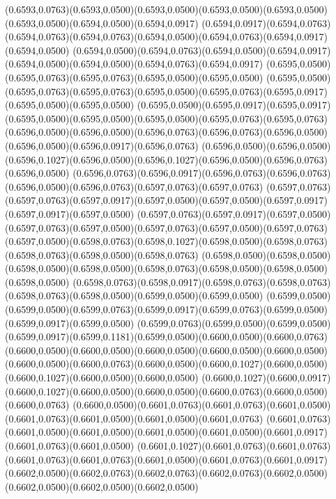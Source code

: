 (0.6593,0.0763)(0.6593,0.0500)(0.6593,0.0500)(0.6593,0.0500)(0.6593,0.0500)(0.6593,0.0500)(0.6594,0.0500)(0.6594,0.0917)
(0.6594,0.0917)(0.6594,0.0763)(0.6594,0.0763)(0.6594,0.0763)(0.6594,0.0500)(0.6594,0.0763)(0.6594,0.0917)(0.6594,0.0500)
(0.6594,0.0500)(0.6594,0.0763)(0.6594,0.0500)(0.6594,0.0917)(0.6594,0.0500)(0.6594,0.0500)(0.6594,0.0763)(0.6594,0.0917)
(0.6595,0.0500)(0.6595,0.0763)(0.6595,0.0763)(0.6595,0.0500)(0.6595,0.0500)
\PST@Solid(0.6595,0.0500)(0.6595,0.0763)(0.6595,0.0763)(0.6595,0.0500)(0.6595,0.0763)(0.6595,0.0917)(0.6595,0.0500)(0.6595,0.0500)
(0.6595,0.0500)(0.6595,0.0917)(0.6595,0.0917)(0.6595,0.0500)(0.6595,0.0500)(0.6595,0.0500)(0.6595,0.0763)(0.6595,0.0763)
(0.6596,0.0500)(0.6596,0.0500)(0.6596,0.0763)(0.6596,0.0763)(0.6596,0.0500)(0.6596,0.0500)(0.6596,0.0917)(0.6596,0.0763)
(0.6596,0.0500)(0.6596,0.0500)(0.6596,0.1027)(0.6596,0.0500)(0.6596,0.1027)(0.6596,0.0500)(0.6596,0.0763)(0.6596,0.0500)
(0.6596,0.0763)(0.6596,0.0917)(0.6596,0.0763)(0.6596,0.0763)(0.6596,0.0500)(0.6596,0.0763)(0.6597,0.0763)(0.6597,0.0763)
(0.6597,0.0763)(0.6597,0.0763)(0.6597,0.0917)(0.6597,0.0500)(0.6597,0.0500)(0.6597,0.0917)(0.6597,0.0917)(0.6597,0.0500)
(0.6597,0.0763)(0.6597,0.0917)(0.6597,0.0500)(0.6597,0.0763)(0.6597,0.0500)(0.6597,0.0763)(0.6597,0.0500)(0.6597,0.0763)
(0.6597,0.0500)(0.6598,0.0763)(0.6598,0.1027)(0.6598,0.0500)(0.6598,0.0763)(0.6598,0.0763)(0.6598,0.0500)(0.6598,0.0763)
(0.6598,0.0500)(0.6598,0.0500)(0.6598,0.0500)(0.6598,0.0500)(0.6598,0.0763)(0.6598,0.0500)(0.6598,0.0500)(0.6598,0.0500)
(0.6598,0.0763)(0.6598,0.0917)(0.6598,0.0763)(0.6598,0.0763)(0.6598,0.0763)(0.6598,0.0500)(0.6599,0.0500)(0.6599,0.0500)
(0.6599,0.0500)(0.6599,0.0500)(0.6599,0.0763)(0.6599,0.0917)(0.6599,0.0763)(0.6599,0.0500)(0.6599,0.0917)(0.6599,0.0500)
(0.6599,0.0763)(0.6599,0.0500)(0.6599,0.0500)(0.6599,0.0917)(0.6599,0.1181)(0.6599,0.0500)(0.6600,0.0500)(0.6600,0.0763)
(0.6600,0.0500)(0.6600,0.0500)(0.6600,0.0500)(0.6600,0.0500)(0.6600,0.0500)
\PST@Solid(0.6600,0.0500)(0.6600,0.0763)(0.6600,0.0500)(0.6600,0.1027)(0.6600,0.0500)(0.6600,0.1027)(0.6600,0.0500)(0.6600,0.0500)
(0.6600,0.1027)(0.6600,0.0917)(0.6600,0.1027)(0.6600,0.0500)(0.6600,0.0500)(0.6600,0.0763)(0.6600,0.0500)(0.6600,0.0763)
(0.6600,0.0500)(0.6601,0.0763)(0.6601,0.0763)(0.6601,0.0500)(0.6601,0.0763)(0.6601,0.0500)(0.6601,0.0500)(0.6601,0.0763)
(0.6601,0.0763)(0.6601,0.0500)(0.6601,0.0500)(0.6601,0.0500)(0.6601,0.0500)(0.6601,0.0917)(0.6601,0.0763)(0.6601,0.0500)
(0.6601,0.1027)(0.6601,0.0763)(0.6601,0.0763)(0.6601,0.0763)(0.6601,0.0763)(0.6601,0.0500)(0.6601,0.0763)(0.6601,0.0917)
(0.6602,0.0500)(0.6602,0.0763)(0.6602,0.0763)(0.6602,0.0763)(0.6602,0.0500)(0.6602,0.0500)(0.6602,0.0500)(0.6602,0.0500)
